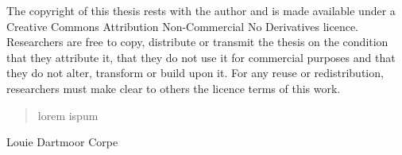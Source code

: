 
\newpage
The copyright of this thesis rests with the author and is made available under a Creative Commons
Attribution Non-Commercial No Derivatives licence. Researchers are free to copy, distribute or
transmit the thesis on the condition that they attribute it, that they do not use it for commercial
purposes and that they do not alter, transform or build upon it. For any reuse or redistribution,
researchers must make clear to others the licence terms of this work.

\begin{abstract}%
lorem ispum
\end{abstract}


\begin{declaration}


  \vspace*{1cm}
  \begin{flushright}
    Louie Dartmoor Corpe
  \end{flushright}
\end{declaration}


\begin{acknowledgements}
\end{acknowledgements}



\tableofcontents

\renewcommand{\listfigurename}{List of figures}
\renewcommand{\listtablename}{List of tables}

\listoffigures
\listoftables

